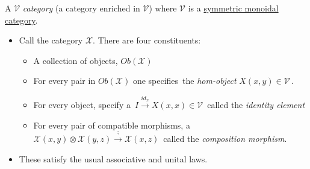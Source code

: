 A $\mathcal{V}$ \emph{category} (a category enriched in $\mathcal{V}$) where $\mathcal{V}$ is a \href{doc/1 math/Seven Sketches in Compositionality/Chapter 4: Co-design/4 Categorification/3 Monoidal categories/1 SMC}{symmetric monoidal category}.

\begin{itemize}
    \item Call the category $\mathcal{X}$. There are four constituents:
          \begin{itemize}
            \item A collection of objects, $Ob(\mathcal{X})$
            \item For every pair in $Ob(\mathcal{X})$ one specifies \,the \emph{hom-object} $X(x,y) \in \mathcal{V}$\,.
            \item For every object, specify a \,$I \xrightarrow{id_x}X(x,x) \in \mathcal{V}$\, called the \emph{identity element}
            \item For every pair of compatible morphisms, a \,$\mathcal{X}(x,y)\otimes\mathcal{X}(y,z)\xrightarrow{;}\mathcal{X}(x,z)$\, called the \emph{composition morphism}.
          \end{itemize}
    \item These satisfy the usual associative and unital laws.

  \end{itemize}
